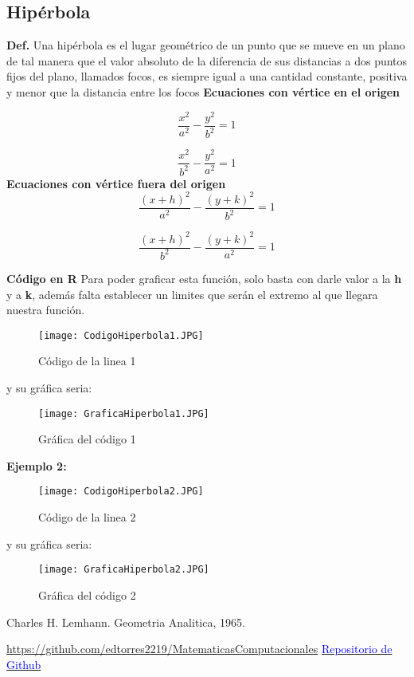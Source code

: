 \documentclass{article}
\begin{document}
\subsection{Hipérbola}
\textbf{Def.} Una hipérbola es el lugar geométrico de un punto que se mueve en un plano de tal manera que el valor absoluto de la diferencia de sus distancias a dos puntos fijos del plano, llamados focos, es siempre igual a una cantidad constante, positiva y menor que la distancia entre los focos
\newline
\textbf{Ecuaciones con vértice en el origen}

\begin{equation}
\frac{x^2}{a^2} - \frac{y^2}{b^2} = 1
\end{equation}

\begin{equation}
\frac{x^2}{b^2} - \frac{y^2}{a^2} = 1
\end{equation}
\newline
\textbf{Ecuaciones con vértice fuera del origen}
\begin{equation}
\frac{(x+h)^2}{a^2} - \frac{(y+k)^2}{b^2} = 1
\end{equation}

\begin{equation}
\frac{(x+h)^2}{b^2} - \frac{(y+k)^2}{a^2} = 1
\end{equation}

\textbf{Código en R}
\newline Para poder graficar esta función, solo basta con darle valor a la \textbf{h} y a \textbf{k}, además falta establecer un limites que serán el extremo al que llegara nuestra función.
\newpage

\begin{figure}
\raggedright
\texttt{[image: CodigoHiperbola1.JPG]}
\caption{Código de la linea 1}
\label{fig:mesh17}
\end{figure}
y su gráfica seria:
\begin{figure}[h]
\centering
\texttt{[image: GraficaHiperbola1.JPG]}
\caption{Gráfica del código 1}
\label{fig:mesh18}
\end{figure}

\textbf{Ejemplo 2:}
\newpage

\begin{figure}
\raggedright
\texttt{[image: CodigoHiperbola2.JPG]}
\caption{Código de la linea 2}
\label{fig:mesh19}
\end{figure}
y su gráfica seria:
\begin{figure}[h]
\centering
\texttt{[image: GraficaHiperbola2.JPG]}
\caption{Gráfica del código 2}
\label{fig:mesh20}
\end{figure}

\begin{thebibliography}{0}
 Charles H. Lemhann. Geometria Analitica, 1965.

\end{thebibliography}
\textcolor{blue}{\url{https://github.com/edtorres2219/MatematicasComputacionales}}
\href{https://github.com/edtorres2219/MatematicasComputacionales}{\textcolor{blue}{Repositorio de Github}}
\end{document}
